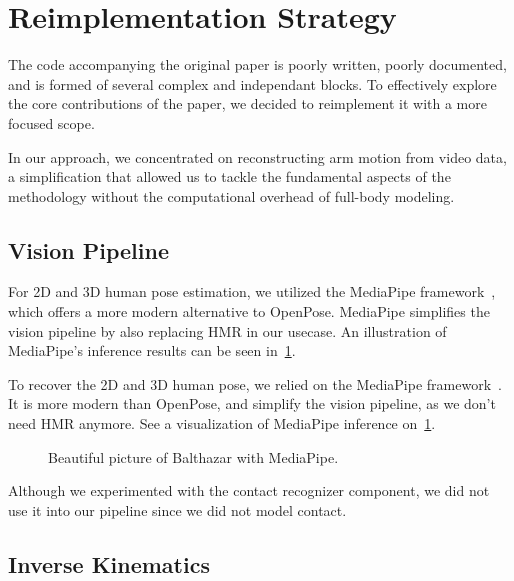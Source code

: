\section{Reimplementation Strategy}
\label{sec:remplementation}

The code accompanying the original paper  is poorly written, poorly documented, and is formed of several complex and independant blocks. 
To effectively explore the core contributions of the paper, we decided to reimplement it with a more focused scope.

In our approach, we concentrated on reconstructing arm motion from video data, a simplification that allowed us to tackle the fundamental 
aspects of the methodology without the computational overhead of full-body modeling.

\subsection{Vision Pipeline}
\label{subsec:vision_pipeline}

For 2D and 3D human pose estimation, we utilized the MediaPipe framework~\cite{lugaresi2019mediapipe}, which offers a more modern alternative 
to OpenPose. MediaPipe simplifies the vision pipeline by also replacing HMR in our usecase. An illustration of MediaPipe's inference results 
can be seen in~\cref{fig:mediapipe}.

To recover the 2D and 3D human pose, we relied on the MediaPipe framework~\cite{lugaresi2019mediapipe}. It is more modern than OpenPose, and 
simplify the vision pipeline, as we don't need HMR anymore. See a visualization of MediaPipe inference on~\cref{fig:mediapipe}.

\begin{figure}
    \centering
    \fbox{\rule{0pt}{2in} \rule{0.9\linewidth}{0pt}}
    \caption{Beautiful picture of Balthazar with MediaPipe.}
    \label{fig:mediapipe}
\end{figure}

Although we experimented with the contact recognizer component, we did not use it into our pipeline since we did not model contact.

\subsection{Inverse Kinematics}